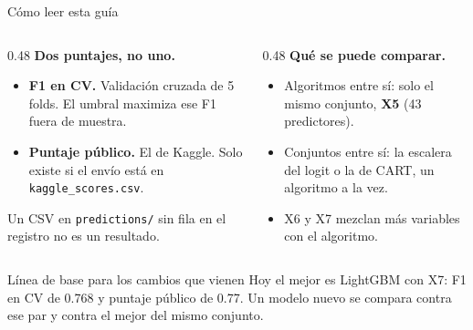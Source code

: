 \documentclass[aspectratio=169,10pt]{beamer}
\begin{document}
\begin{frame}{Cómo leer esta guía}
  \small
  \setlength{\itemsep}{0.22em}
  \begin{columns}[T,onlytextwidth]
    \begin{column}{0.48\textwidth}
      \textbf{Dos puntajes, no uno.}
      \begin{itemize}
        \item \textbf{F1 en CV.} Validación cruzada de 5 folds. El umbral maximiza ese F1 fuera de muestra.
        \item \textbf{Puntaje público.} El de Kaggle. Solo existe si el envío está en \texttt{kaggle\_scores.csv}.
      \end{itemize}
      Un CSV en \texttt{predictions/} sin fila en el registro no es un resultado.
    \end{column}
    \begin{column}{0.48\textwidth}
      \textbf{Qué se puede comparar.}
      \begin{itemize}
        \item Algoritmos entre sí: solo el mismo conjunto, \textbf{X5} (43 predictores).
        \item Conjuntos entre sí: la escalera del logit o la de CART, un algoritmo a la vez.
        \item X6 y X7 mezclan más variables con el algoritmo.
      \end{itemize}
    \end{column}
  \end{columns}
  \vspace{0.35em}
  \begin{block}{Línea de base para los cambios que vienen}
    Hoy el mejor es LightGBM con X7: F1 en CV de 0.768 y puntaje público de 0.77. Un modelo nuevo se compara contra ese par y contra el mejor del mismo conjunto.
  \end{block}
\end{frame}
\end{document}
